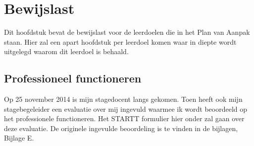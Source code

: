 \section{Bewijslast}
Dit hoofdstuk bevat de bewijslast voor de leerdoelen die in het Plan van Aanpak staan. Hier zal een apart hoofdstuk per leerdoel komen waar in diepte wordt uitgelegd waarom dit leerdoel is behaald.

\subsection{Professioneel functioneren}
Op 25 november 2014 is mijn stagedocent langs gekomen. Toen heeft ook mijn stagebegeleider een evaluatie over mij ingevuld waarmee ik wordt beoordeeld op het professionele functioneren. Het STARTT formulier hier onder zal gaan over deze evaluatie. De originele ingevulde beoordeling is te vinden in de bijlagen, Bijlage E.

